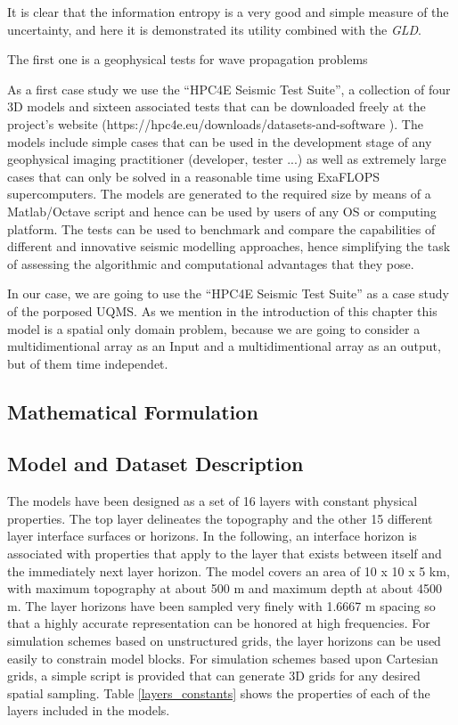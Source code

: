 It is clear that the information entropy is a very good and simple measure of the uncertainty, and here it is demonstrated its utility combined with the \textit{GLD}.

The first one is a geophysical tests for wave propagation problems

As a first case study we use the “HPC4E Seismic Test Suite”, a collection of four 3D models and sixteen associated tests that can be downloaded freely at the project's website (https://hpc4e.eu/downloads/datasets-and-software ). The models include simple cases that can be used in the development stage of any geophysical imaging practitioner (developer, tester ...) as well as extremely large cases that can only be solved in a reasonable time using ExaFLOPS supercomputers. The models are generated to the required size by means of a Matlab/Octave script and hence can be used by users of any OS or computing platform. The tests can be used to benchmark and compare the capabilities of different and innovative seismic modelling approaches, hence simplifying the task of assessing the algorithmic and computational advantages that they pose. %

In our case, we are going to use the “HPC4E Seismic Test Suite” as a case study of the porposed UQMS. As we mention in the introduction of this chapter this model is a spatial only domain problem, because we are going to consider a multidimentional array as an Input and a multidimentional array as an output, but of them time independet.

\subsection{Mathematical Formulation}

\subsection{Model and Dataset Description}
The models have been designed as a set of 16 layers with constant physical properties. The top layer delineates the topography and the other 15 different layer interface surfaces or horizons. In the following, an interface horizon is associated with properties that apply to the layer that exists between itself and the immediately next layer horizon. The model covers an area of 10 x 10 x 5 km, with maximum topography at about 500 m and maximum depth at about 4500 m. The layer horizons have been sampled very finely with 1.6667 m spacing so that a highly accurate representation can be honored at high frequencies. For simulation schemes based on unstructured grids, the layer horizons can be used easily to constrain model blocks. For simulation schemes based upon Cartesian grids, a simple script is provided that can generate 3D grids for any desired spatial sampling. Table \ref{layers_constants} shows the properties of each of the layers included in the models. %

